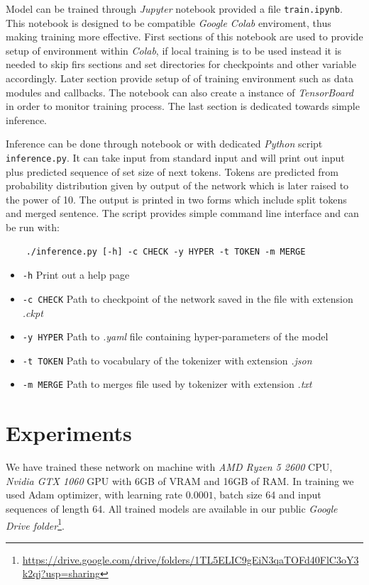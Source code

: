 Model can be trained through \textit{Jupyter} notebook provided a file \texttt{train.ipynb}. This notebook is designed to be compatible \textit{Google Colab} enviroment, thus making training more effective. First sections of this notebook are used to provide setup of environment within \textit{Colab}, if local training is to be used instead it is needed to skip firs sections and set directories for checkpoints and other variable accordingly. Later section provide setup of of training environment such as data modules and callbacks. The notebook can also create a instance of \textit{TensorBoard} in order to monitor training process. The last section is dedicated towards simple inference.

Inference can be done through notebook or with dedicated \textit{Python} script \texttt{inference.py}. It can take input from standard input and will print out input plus predicted sequence of set size of next tokens. Tokens are predicted from probability distribution given by output of the network which is later raised to the power of 10. The output is printed in two forms which include split tokens and merged sentence. The script provides simple command line interface and can be run with:
\begin{verbatim}
    ./inference.py [-h] -c CHECK -y HYPER -t TOKEN -m MERGE
\end{verbatim}
\begin{itemize}
    \item \texttt{-h} Print out a help page
    \item \texttt{-c CHECK} Path to checkpoint of the network saved in the file with extension \textit{.ckpt}
    \item \texttt{-y HYPER} Path to \textit{.yaml} file containing hyper-parameters of the model
    \item \texttt{-t TOKEN} Path to vocabulary of the tokenizer with extension \textit{.json}
    \item \texttt{-m MERGE} Path to merges file used by tokenizer with extension \textit{.txt}
\end{itemize}

\section{Experiments}

We have trained these network on machine with \textit{AMD Ryzen 5 2600} CPU, \textit{Nvidia GTX 1060} GPU with 6GB of VRAM and 16GB of RAM. In training we used Adam optimizer, with learning rate $0.0001$, batch size 64 and input sequences of length 64. All trained models are available in our public \textit{Google Drive folder}\footnote{\url{https://drive.google.com/drive/folders/1TL5ELIC9gEiN3qaTOFd40FlC3oY3k2qj?usp=sharing}}.

